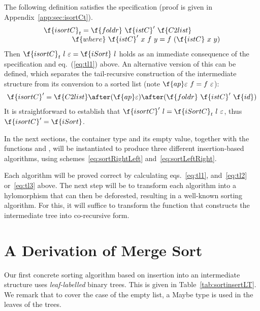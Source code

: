 \documentclass[a4paper,11pt]{llncs}
\begin{document}
The following definition satisfies the specification (proof is given
in Appendix~\ref{app:sec:isortCt}).
$$
\begin{array}{l}
  \f{isortC}_t =  \f{foldr}\ \f{istC}'\ \f{C2list}\\
  \qquad \qquad  \f{where}\  \f{istC}'\ x\ f\ y = f\ (\f{istC}\ x\ y)\\
\end{array}
$$
Then $\f{isortC}_t\ l\ \varepsilon  = \f{iSort}\ l$ holds as an immediate
consequence of the specification and eq.~(\ref{eq:tl1}) above.
An alternative version of this can be defined, which separates the
tail-recursive construction of the intermediate structure from its
conversion to a sorted list (note $\f{ap} \varepsilon\ f = f\ \varepsilon$):
\begin{align}
\f{isortC}' = \f{C2list} \after (\f{ap} \varepsilon) \after (\f{foldr}\ \f{istC}'\ \f{id})
\label{eq:sortLeftRight}
\end{align}
It is straightforward to establish that $\f{isortC}'\ l =
\f{iSortC}_t\ l\ \varepsilon$, thus $\f{isortC}' =  \f{iSort}$.





In the next sections, the container type and its empty value, together
with the functions  and , will be instantiated to
produce three different insertion-based algorithms, using
schemes~\ref{eq:sortRightLeft} and~\ref{eq:sortLeftRight}. 

Each algorithm will be proved correct by calculating
eqs.~\ref{eq:tl1}, and~\ref{eq:tl2} or~\ref{eq:tl3} above. The next
step will be to transform each algorithm into a hylomorphism that can
then be deforested, resulting in a well-known sorting algorithm.  For
this, it will suffice to transform the function that constructs the
intermediate tree into co-recursive form.





\section{A Derivation of Merge Sort}
\label{sec:mergesort}

Our first concrete sorting algorithm based on insertion into an
intermediate structure uses \emph{leaf-labelled} binary trees.  This
is given in Table~\ref{tab:sortinsertLT}. We remark that to cover the
case of the empty list, a Maybe type is used in the leaves of the
trees.
\end{document}
